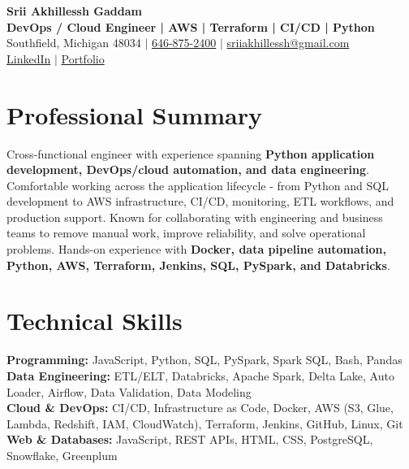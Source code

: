 \documentclass[letterpaper,10pt]{article}
\begin{document}
\fontsize{9.35pt}{10.45pt}\selectfont

\begin{center}
    {\LARGE \textbf{Srii Akhillessh Gaddam}} \\[-1pt]
    \textbf{DevOps / Cloud Engineer | AWS | Terraform | CI/CD | Python} \\[2pt]
    Southfield, Michigan 48034 $|$
    \href{tel:6468752400}{646-875-2400} $|$
    \href{mailto:sriiakhillessh@gmail.com}{sriiakhillessh@gmail.com} \\[1pt]
    \href{https://www.linkedin.com/in/srii-akhiilessh-gaddam-b48668191/}{LinkedIn} $|$
    \href{https://sriiakhillesshg.github.io/portfolio/}{Portfolio}
\end{center}
\vspace{-8pt}

\section{Professional Summary}
\small{Cross-functional engineer with experience spanning \textbf{Python application development, DevOps/cloud automation, and data engineering}. Comfortable working across the application lifecycle - from Python and SQL development to AWS infrastructure, CI/CD, monitoring, ETL workflows, and production support. Known for collaborating with engineering and business teams to remove manual work, improve reliability, and solve operational problems. Hands-on experience with \textbf{Docker, data pipeline automation, Python, AWS, Terraform, Jenkins, SQL, PySpark, and Databricks}.}

\section{Technical Skills}
\small{
\textbf{Programming:} JavaScript, Python, SQL, PySpark, Spark SQL, Bash, Pandas \\
\textbf{Data Engineering:} ETL/ELT, Databricks, Apache Spark, Delta Lake, Auto Loader, Airflow, Data Validation, Data Modeling \\
\textbf{Cloud \& DevOps:} CI/CD, Infrastructure as Code, Docker, AWS (S3, Glue, Lambda, Redshift, IAM, CloudWatch), Terraform, Jenkins, GitHub, Linux, Git \\
\textbf{Web \& Databases:} JavaScript, REST APIs, HTML, CSS, PostgreSQL, Snowflake, Greenplum
}
\end{document}
